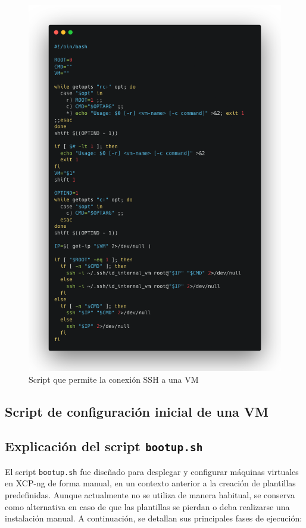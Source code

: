 \begin{figure}[H]
    \centering
    \includegraphics[width=\textwidth]{tablas-images/cp6/src/ssh-vm.png}
    \caption{Script que permite la conexión SSH a una VM}\label{fig:sshvm}
\end{figure}

\subsection{Script de configuración inicial de una VM}

\subsection{Explicación del script \texttt{bootup.sh}}

El script \texttt{bootup.sh} fue diseñado para desplegar y configurar máquinas virtuales en XCP-ng de forma manual, en un contexto anterior a la creación de plantillas predefinidas. Aunque actualmente no se utiliza de manera habitual, se conserva como alternativa en caso de que las plantillas se pierdan o deba realizarse una instalación manual. A continuación, se detallan sus principales fases de ejecución:


